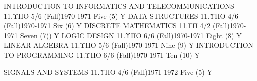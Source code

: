 \begin{grades}
    \begin{gradesgrouping}[1970-1971]
            {INTRODUCTION TO INFORMATICS AND TELECOMMUNICATIONS}
            {11.ΥΠΟ}
            {5/6}
            {(Fall)1970-1971}
            {Five (5)}
            {Y}
            {DATA STRUCTURES}
            {11.ΥΠΟ}
            {4/6}
            {(Fall)1970-1971}
            {Six (6)}
            {Y}
            {DISCRETE MATHEMATICS}
            {11.ΓΠ}
            {4/2}
            {(Fall)1970-1971}
            {Seven (7))}
            {Y}
            {LOGIC DESIGN}
            {11.ΥΠΟ}
            {6/6}
            {(Fall)1970-1971}
            {Eight (8)}
            {Y}
            {LINEAR ALGEBRA}
            {11.ΥΠΟ}
            {5/6}
            {(Fall)1970-1971}
            {Nine (9)}
            {Y}
            {INTRODUCTION TO PROGRAMMING}
            {11.ΥΠΟ}
            {6/6}
            {(Fall)1970-1971}
            {Ten (10)}
            {Y}
    \end{gradesgrouping}
    \clearpage
    \begin{gradesgrouping}[1971-1972]
            {SIGNALS AND SYSTEMS}
            {11.ΥΠΟ}
            {4/6}
            {(Fall)1971-1972}
            {Five (5)}
            {Y}
    \end{gradesgrouping}
\end{grades}
